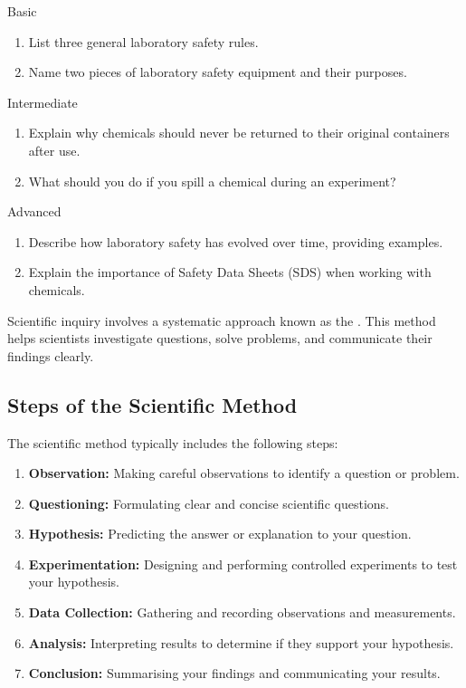 \begin{tieredquestions}{Basic}
\begin{enumerate}
    \item List three general laboratory safety rules.
    \item Name two pieces of laboratory safety equipment and their purposes.
\end{enumerate}
\end{tieredquestions}

\begin{tieredquestions}{Intermediate}
\begin{enumerate}
    \item Explain why chemicals should never be returned to their original containers after use.
    \item What should you do if you spill a chemical during an experiment?
\end{enumerate}
\end{tieredquestions}

\begin{tieredquestions}{Advanced}
\begin{enumerate}
    \item Describe how laboratory safety has evolved over time, providing examples.
    \item Explain the importance of Safety Data Sheets (SDS) when working with chemicals.
\end{enumerate}
\end{tieredquestions}

\FloatBarrier

Scientific inquiry involves a systematic approach known as the . This method helps scientists investigate questions, solve problems, and communicate their findings clearly.

\subsection{Steps of the Scientific Method}

The scientific method typically includes the following steps:

\begin{enumerate}
    \item \textbf{Observation:} Making careful observations to identify a question or problem.
    \item \textbf{Questioning:} Formulating clear and concise scientific questions.
    \item \textbf{Hypothesis:} Predicting the answer or explanation to your question.
    \item \textbf{Experimentation:} Designing and performing controlled experiments to test your hypothesis.
    \item \textbf{Data Collection:} Gathering and recording observations and measurements.
    \item \textbf{Analysis:} Interpreting results to determine if they support your hypothesis.
    \item \textbf{Conclusion:} Summarising your findings and communicating your results.
\end{enumerate}


